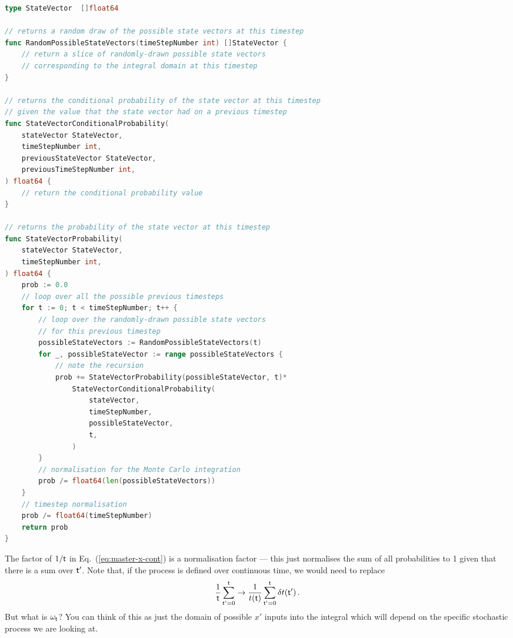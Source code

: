 \begin{lstlisting}[language=Go]
type StateVector  []float64

// returns a random draw of the possible state vectors at this timestep
func RandomPossibleStateVectors(timeStepNumber int) []StateVector {
    // return a slice of randomly-drawn possible state vectors 
    // corresponding to the integral domain at this timestep
}

// returns the conditional probability of the state vector at this timestep 
// given the value that the state vector had on a previous timestep
func StateVectorConditionalProbability(
    stateVector StateVector,
    timeStepNumber int,
    previousStateVector StateVector,
    previousTimeStepNumber int,
) float64 {
    // return the conditional probability value
}

// returns the probability of the state vector at this timestep
func StateVectorProbability(
    stateVector StateVector, 
    timeStepNumber int,
) float64 {
    prob := 0.0
    // loop over all the possible previous timesteps
    for t := 0; t < timeStepNumber; t++ {
        // loop over the randomly-drawn possible state vectors 
        // for this previous timestep
        possibleStateVectors := RandomPossibleStateVectors(t)
        for _, possibleStateVector := range possibleStateVectors {
            // note the recursion
            prob += StateVectorProbability(possibleStateVector, t)*
                StateVectorConditionalProbability(
                    stateVector,
                    timeStepNumber,
                    possibleStateVector, 
                    t,
                )
        }
        // normalisation for the Monte Carlo integration
        prob /= float64(len(possibleStateVectors))
    }
    // timestep normalisation
    prob /= float64(timeStepNumber)
    return prob
}
\end{lstlisting}

The factor of $1/{\sf t}$ in Eq.~(\ref{eq:master-x-cont}) is a normalisation factor --- this just normalises the sum of all probabilities to 1 given that there is a sum over ${\sf t}'$. Note that, if the process is defined over continuous time, we would need to replace 
\begin{align}
\frac{1}{{\sf t}}\sum_{{\sf t}'=0}^{{\sf t}} \rightarrow \frac{1}{t({\sf t})}\sum_{{\sf t}'=0}^{{\sf t}}\delta t({\sf t}') \,.
\end{align}
But what is $\omega_{\sf t}$? You can think of this as just the domain of possible $x'$ inputs into the integral which will depend on the specific stochastic process we are looking at.

